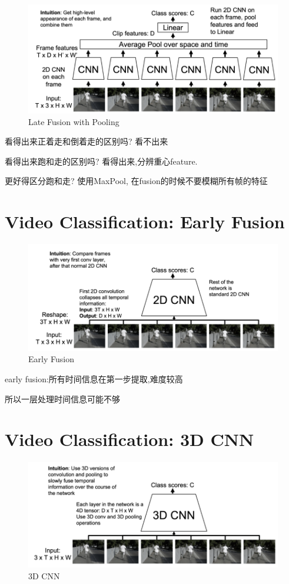 \begin{figure}[htbp]
    \centering
    \includegraphics[scale=0.25]{figures/LF_pool.png}
    \caption{Late Fusion with Pooling}
\end{figure}

看得出来正着走和倒着走的区别吗? 看不出来

看得出来跑和走的区别吗? 看得出来,分辨重心feature.

更好得区分跑和走? 使用MaxPool, 在fusion的时候不要模糊所有帧的特征

\section{Video Classification: Early Fusion}

\begin{figure}[htbp]
    \centering
    \includegraphics[scale=0.25]{figures/EF.png}
    \caption{Early Fusion}
\end{figure}

early fusion:所有时间信息在第一步提取,难度较高

所以一层处理时间信息可能不够

\section{Video Classification: 3D CNN}

\begin{figure}[htbp]
    \centering
    \includegraphics[scale=0.25]{figures/3DCNN.png}
    \caption{3D CNN}
\end{figure}

